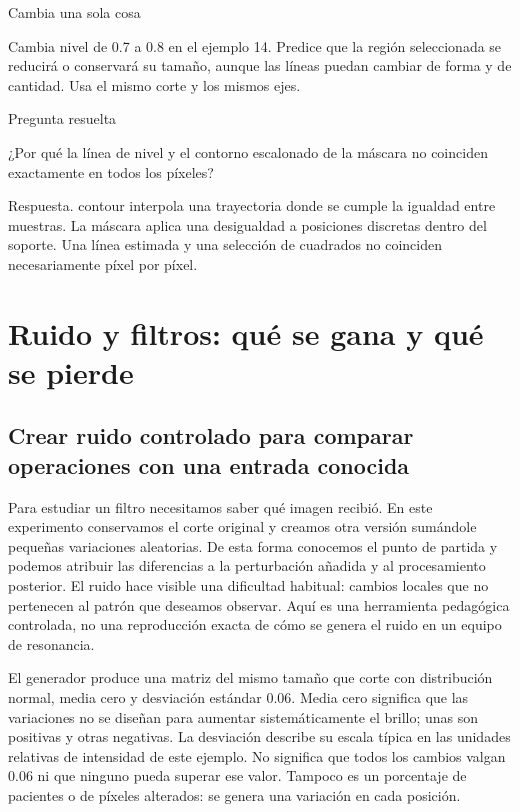 
\begin{Practica}{Cambia una sola cosa}

Cambia nivel de 0.7 a 0.8 en el ejemplo 14. Predice que la región seleccionada se reducirá o conservará su tamaño, aunque las líneas puedan cambiar de forma y de cantidad. Usa el mismo corte y los mismos ejes.


\end{Practica}


\begin{Idea}{Pregunta resuelta}

¿Por qué la línea de nivel y el contorno escalonado de la máscara no coinciden exactamente en todos los píxeles?


Respuesta. contour interpola una trayectoria donde se cumple la igualdad entre muestras. La máscara aplica una desigualdad a posiciones discretas dentro del soporte. Una línea estimada y una selección de cuadrados no coinciden necesariamente píxel por píxel.


\end{Idea}

\chapter[Ruido y filtros]{Ruido y filtros: qué se gana y qué se pierde}

\label{cap:filtros}

\section{Crear ruido controlado para comparar operaciones con una entrada conocida}


Para estudiar un filtro necesitamos saber qué imagen recibió. En este experimento conservamos el corte original y creamos otra versión sumándole pequeñas variaciones aleatorias. De esta forma conocemos el punto de partida y podemos atribuir las diferencias a la perturbación añadida y al procesamiento posterior. El ruido hace visible una dificultad habitual: cambios locales que no pertenecen al patrón que deseamos observar. Aquí es una herramienta pedagógica controlada, no una reproducción exacta de cómo se genera el ruido en un equipo de resonancia.


El generador produce una matriz del mismo tamaño que corte con distribución normal, media cero y desviación estándar 0.06. Media cero significa que las variaciones no se diseñan para aumentar sistemáticamente el brillo; unas son positivas y otras negativas. La desviación describe su escala típica en las unidades relativas de intensidad de este ejemplo. No significa que todos los cambios valgan 0.06 ni que ninguno pueda superar ese valor. Tampoco es un porcentaje de pacientes o de píxeles alterados: se genera una variación en cada posición.


